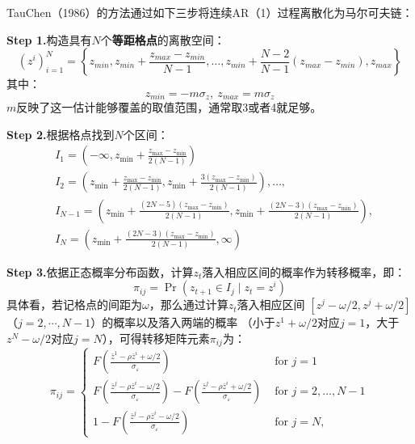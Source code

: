 TauChen（1986）的方法通过如下三步将连续AR（1）过程离散化为马尔可夫链：

\textbf{Step 1.}构造具有$N$个\textbf{等距格点}的离散空间：
\begin{equation*}
    \left(z^i\right)_{i=1}^N =
        \left\{z_{min }, z_{min }+\frac{z_{max }-z_{min }}{N-1}, \ldots, 
            z_{min }+\frac{N-2}{N-1}\left(z_{max }-z_{min }\right), z_{max }\right\}
\end{equation*}
其中：
\begin{equation*}
    z_{min} = -m\sigma_z,~z_{max} = m\sigma_z
\end{equation*}
$m$反映了这一估计能够覆盖的取值范围，通常取3或者4就足够。

\textbf{Step 2.}根据格点找到$N$个区间：
\begin{equation*}
    \begin{aligned}
        & I_1 = \left(-\infty, z_{\min }+\frac{z_{\max }-z_{\min }}{2(N-1)}\right) \\
        & I_2 = \left(z_{\min }+\frac{z_{\max }-z_{\min }}{2(N-1)}, z_{\min }
            +\frac{3\left(z_{\max }-z_{\min }\right)}{2(N-1)}\right), \ldots, \\
        & I_{N-1} = \left(z_{\min }+\frac{(2 N-5)\left(z_{\max }-z_{\min }\right)}{2(N-1)}, 
            z_{\min }+\frac{(2 N-3)\left(z_{\max }-z_{\min }\right)}{2(N-1)}\right), \\
        & I_N = \left(z_{\min }+\frac{(2 N-3)\left(z_{\max }-z_{\min }\right)}{2(N-1)}, \infty\right)
    \end{aligned}
\end{equation*}

\textbf{Step 3.}依据正态概率分布函数，计算$z_t$落入相应区间的概率作为转移概率，即：
\begin{equation*}
    \pi_{ij} = \operatorname{Pr}\left(z_{t+1}\in I_j\mid z_t = z^i\right)
\end{equation*}
具体看，若记格点的间距为$\omega$，那么通过计算$z_t$落入相应区间
$\left[z^j-\omega/2,z^j+\omega/2\right]$（$j=2,\cdots,N-1$）的概率以及落入两端的概率
（小于$z^1+\omega/2$对应$j=1$，大于$z^N-\omega/2$对应$j=N$），可得转移矩阵元素$\pi_{ij}$为：
\begin{equation*}
    \pi_{i j} = 
        \begin{cases}
            F\left(\frac{\bar{z}^1-\rho \bar{z}^i+\omega / 2}{\sigma_{\varepsilon}}\right) & \text { for } j=1 \\ 
            F\left(\frac{\bar{z}^j-\rho \bar{z}^i-\omega / 2}{\sigma_{\varepsilon}}\right) - 
                F\left(\frac{\bar{z}^j-\rho \bar{z}^i+\omega / 2}{\sigma_{\varepsilon}}\right) & 
                    \text { for } j=2, \ldots, N-1 \\ 
            1-F\left(\frac{\bar{z}^j-\rho \bar{z}^i-\omega / 2}{\sigma_{\varepsilon}}\right) & \text { for } j=N,
        \end{cases}
\end{equation*}



